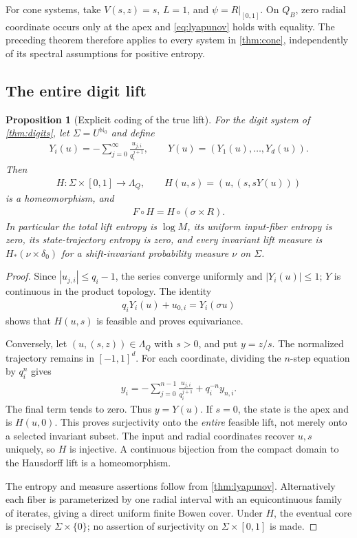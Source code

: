 \documentclass[11pt,a4paper]{article}
\newtheorem{proposition}[theorem]{Proposition}
\theoremstyle{definition}
\theoremstyle{remark}
\begin{document}
For cone systems, take \(V(s,z)=s\), \(L=1\), and \(\psi=R|_{[0,1]}\). On \(Q_B\), zero radial coordinate occurs only at the apex and \eqref{eq:lyapunov} holds with equality. The preceding theorem therefore applies to every system in \cref{thm:cone}, independently of its spectral assumptions for positive entropy.

\subsection{The entire digit lift}

\begin{proposition}[Explicit coding of the true lift]\label{prop:coding}
For the digit system of \cref{thm:digits}, let \(\Sigma=U^{\mathbb N_0}\) and define
\begin{align*}
 Y_i(u)=-\sum_{j=0}^{\infty}\frac{u_{j,i}}{q_i^{j+1}},
       \qquad Y(u)=(Y_1(u),\ldots,Y_d(u)).
\end{align*}
Then
\begin{align}\label{eq:H}
 H:\Sigma\times[0,1]\longrightarrow\Lambda_Q,\qquad
 H(u,s)=(u,(s,sY(u)))
\end{align}
is a homeomorphism, and
\begin{align*}
 F\circ H=H\circ(\sigma\times R).
\end{align*}
In particular the total lift entropy is \(\log M\), its uniform input-fiber entropy is zero, its state-trajectory entropy is zero, and every invariant lift measure is \(H_*(\nu\times\delta_0)\) for a shift-invariant probability measure \(\nu\) on \(\Sigma\).
\end{proposition}
\begin{proof}
Since \(|u_{j,i}|\leq q_i-1\), the series converge uniformly and \(|Y_i(u)|\leq1\); \(Y\) is continuous in the product topology. The identity
\begin{align*}
 q_iY_i(u)+u_{0,i}=Y_i(\sigma u)
\end{align*}
shows that \(H(u,s)\) is feasible and proves equivariance.

Conversely, let \((u,(s,z))\in\Lambda_Q\) with \(s>0\), and put \(y=z/s\). The normalized trajectory remains in \([-1,1]^d\). For each coordinate, dividing the \(n\)-step equation by \(q_i^n\) gives
\begin{align*}
 y_i=-\sum_{j=0}^{n-1}\frac{u_{j,i}}{q_i^{j+1}}
           +q_i^{-n}y_{n,i}.
\end{align*}
The final term tends to zero. Thus \(y=Y(u)\). If \(s=0\), the state is the apex and is \(H(u,0)\). This proves surjectivity onto the \emph{entire} feasible lift, not merely onto a selected invariant subset. The input and radial coordinates recover \(u,s\) uniquely, so \(H\) is injective. A continuous bijection from the compact domain to the Hausdorff lift is a homeomorphism.

The entropy and measure assertions follow from \cref{thm:lyapunov}. Alternatively each fiber is parameterized by one radial interval with an equicontinuous family of iterates, giving a direct uniform finite Bowen cover. Under \(H\), the eventual core is precisely \(\Sigma\times\{0\}\); no assertion of surjectivity on \(\Sigma\times[0,1]\) is made.
\end{proof}
\end{document}
